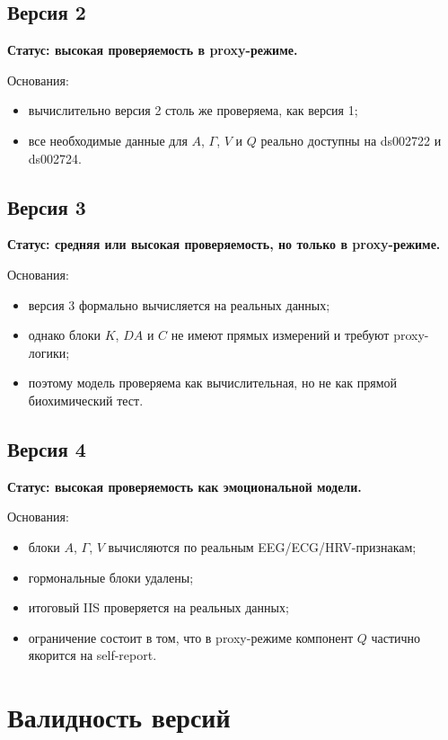 \documentclass[12pt,a4paper]{article}
\begin{document}
\subsection{Версия 2}
\textbf{Статус: высокая проверяемость в proxy-режиме.}

Основания:
\begin{itemize}[leftmargin=1.25cm]
    \item вычислительно версия 2 столь же проверяема, как версия 1;
    \item все необходимые данные для $A$, $\Gamma$, $V$ и $Q$ реально доступны на ds002722 и ds002724.
\end{itemize}

\subsection{Версия 3}
\textbf{Статус: средняя или высокая проверяемость, но только в proxy-режиме.}

Основания:
\begin{itemize}[leftmargin=1.25cm]
    \item версия 3 формально вычисляется на реальных данных;
    \item однако блоки $K$, $DA$ и $C$ не имеют прямых измерений и требуют proxy-логики;
    \item поэтому модель проверяема как вычислительная, но не как прямой биохимический тест.
\end{itemize}

\subsection{Версия 4}
\textbf{Статус: высокая проверяемость как эмоциональной модели.}

Основания:
\begin{itemize}[leftmargin=1.25cm]
    \item блоки $A$, $\Gamma$, $V$ вычисляются по реальным EEG/ECG/HRV-признакам;
    \item гормональные блоки удалены;
    \item итоговый IIS проверяется на реальных данных;
    \item ограничение состоит в том, что в proxy-режиме компонент $Q$ частично якорится на self-report.
\end{itemize}

\section{Валидность версий}
\end{document}

